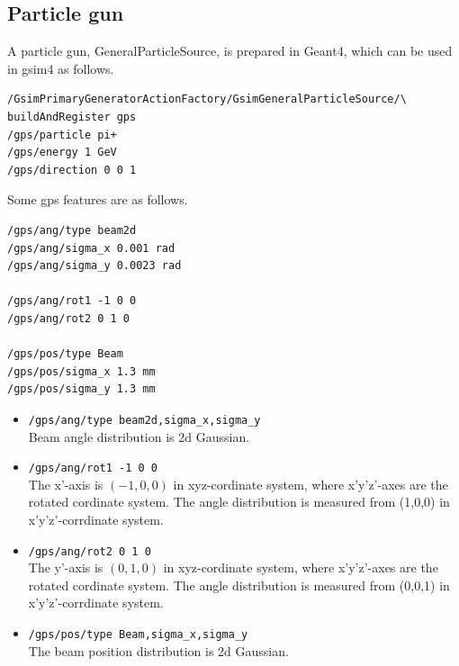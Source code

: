 \documentclass[a4paper,12pt]{article}
\begin{document}
 \subsection{Particle gun}
 A particle gun, GeneralParticleSource, is prepared in Geant4,
 which can be used in gsim4 as follows.
 \begin{screen}
  \begin{verbatim}
/GsimPrimaryGeneratorActionFactory/GsimGeneralParticleSource/\
buildAndRegister gps
/gps/particle pi+
/gps/energy 1 GeV
/gps/direction 0 0 1\end{verbatim}
 \end{screen}
 Some gps features are as follows.
 \begin{screen}
  \begin{verbatim}
/gps/ang/type beam2d
/gps/ang/sigma_x 0.001 rad
/gps/ang/sigma_y 0.0023 rad

/gps/ang/rot1 -1 0 0
/gps/ang/rot2 0 1 0

/gps/pos/type Beam
/gps/pos/sigma_x 1.3 mm
/gps/pos/sigma_y 1.3 mm\end{verbatim}
 \end{screen}
 \begin{itemize}
  \item {\tt /gps/ang/type beam2d,sigma\_x,sigma\_y}\\
	Beam angle distribution is 2d Gaussian.
  \item {\tt /gps/ang/rot1 -1 0 0}\\
	The x'-axis is $(-1,0,0)$ in xyz-cordinate system,
	where x'y'z'-axes are the rotated cordinate system.
	The angle distribution is measured from (1,0,0) in
	x'y'z'-corrdinate system.
  \item {\tt /gps/ang/rot2 0 1 0}\\
	The y'-axis is $(0,1,0)$ in xyz-cordinate system,
	where x'y'z'-axes are the rotated cordinate system.
	The angle distribution is measured from (0,0,1) in
	x'y'z'-corrdinate system.
  \item {\tt /gps/pos/type Beam,sigma\_x,sigma\_y}\\
	The beam position distribution is 2d Gaussian.
 \end{itemize}
 
\end{document}

